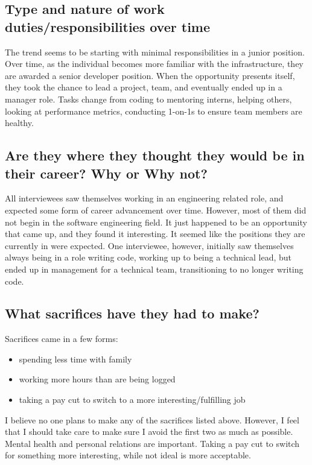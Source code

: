 \subsection{Type and nature of work duties/responsibilities over time}
The trend seems to be starting with minimal responsibilities in a junior
position. Over time, as the individual becomes more familiar with the
infrastructure, they are awarded a senior developer position. When the
opportunity presents itself, they took the chance to lead a project, team, and
eventually ended up in a manager role. Tasks change from coding to 
mentoring interns, helping others, looking at performance metrics, 
conducting 1-on-1s to ensure team members are healthy. 

\subsection{Are they where they thought they would be in their career? Why or Why not?}
All interviewees saw themselves working in an engineering related role, and
expected some form of career advancement over time. However, most of them did
not begin in the software engineering field. It just happened to be an
opportunity that came up, and they found it interesting. It seemed like the
positions they are currently in were expected. One interviewee, however,
initially saw themselves always being in a role writing code, working up to
being a technical lead, but ended up in management for a technical team,
transitioning to no longer writing code.

\subsection{What sacrifices have they had to make?}
Sacrifices came in a few forms:
\begin{singlespace}
  \begin{itemize}
    \item spending less time with family
    \item working more hours than are being logged
    \item taking a pay cut to switch to a more interesting/fulfilling job
  \end{itemize}
\end{singlespace}
I believe no one plans to make any of the sacrifices listed above. 
However, I feel that I should take care to make sure I avoid the first two 
as much as possible. Mental health and personal relations are important. 
Taking a pay cut to switch for something more interesting, while not ideal
is more acceptable. 

